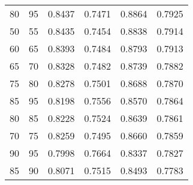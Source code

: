 \begin{center}
\begin{longtable}{|l|l|l|l|l|l|}
80 & 95 & 0.8437 & 0.7471 & 0.8864 & 0.7925 \\
50 & 55 & 0.8435 & 0.7454 & 0.8838 & 0.7914 \\
60 & 65 & 0.8393 & 0.7484 & 0.8793 & 0.7913 \\
65 & 70 & 0.8328 & 0.7482 & 0.8739 & 0.7882 \\
75 & 80 & 0.8278 & 0.7501 & 0.8688 & 0.7870 \\
85 & 95 & 0.8198 & 0.7556 & 0.8570 & 0.7864 \\
80 & 85 & 0.8228 & 0.7524 & 0.8639 & 0.7861 \\
70 & 75 & 0.8259 & 0.7495 & 0.8660 & 0.7859 \\
90 & 95 & 0.7998 & 0.7664 & 0.8337 & 0.7827 \\
85 & 90 & 0.8071 & 0.7515 & 0.8493 & 0.7783
\end{longtable}

\end{center}



